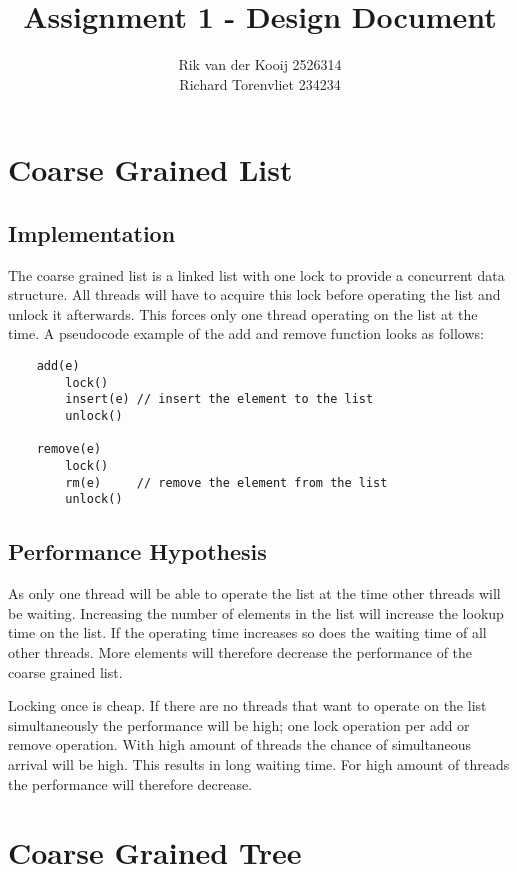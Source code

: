 \documentclass[10pt,a4paper]{article}
\author{Rik van der Kooij 2526314\\Richard Torenvliet 234234}
\title{Assignment 1 - Design Document}
\begin{document}
\maketitle



\section{Coarse Grained List}
\subsection{Implementation}
    The coarse grained list is a linked list with one lock to provide a concurrent data structure. All threads will have to acquire this lock before operating the list and unlock it afterwards. This forces only one thread operating on the list at the time. A pseudocode example of the add and remove function looks as follows:
   
\begin{lstlisting}
    add(e) 
        lock()
        insert(e) // insert the element to the list
        unlock()

    remove(e)
        lock()
        rm(e)     // remove the element from the list
        unlock()
\end{lstlisting}

\subsection{Performance Hypothesis}
As only one thread will be able to operate the list at the time other threads will be waiting. Increasing the number of elements in the list will increase the lookup time on the list. If the operating time increases so does the waiting time of all other threads. More elements will therefore decrease the performance of the coarse grained list.

Locking once is cheap. If there are no threads that want to operate on the list simultaneously the performance will be high; one lock operation per add or remove operation. 
With high amount of threads the chance of simultaneous arrival will be high. This results in long waiting time. For high amount of threads the performance will therefore decrease. 

\section{Coarse Grained Tree}
\end{document}
